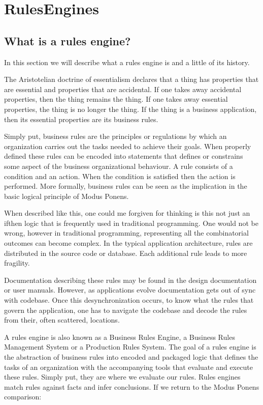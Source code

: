 \section{RulesEngines}

\subsection{What is a rules engine?}

In this section we will describe what a rules engine is and a little of its history.

The Aristotelian doctrine of essentialism declares that a thing has properties that are essential and properties that are accidental.
If one takes away accidental properties, then the thing remains the thing.
If one takes away essential properties, the thing is no longer the thing.
If the thing is a business application, then its essential properties are its business rules.


Simply put, business rules are the principles or regulations by which an organization carries out the tasks needed to achieve their goals.
When properly defined these rules can be encoded into statements that defines or constrains some aspect of the business organizational behaviour.
A rule consists of a condition and an action. 
When the condition is satisfied then the action is performed.
More formally, business rules can be seen as the implication in the basic logical principle of Modus Ponens.

When described like this, one could me forgiven for thinking is this not just an if\-then logic that is frequently used in traditional programming.
One would not be wrong, however in traditional programming, representing all the combinatorial outcomes can become complex.
In the typical application architecture, rules are distributed in the source code or database.
Each additional rule leads to more fragility.

Documentation describing these rules may be found in the design documentation or user manuals.
However, as applications evolve documentation gets out of sync with codebase.
Once this desynchronization occurs, to know what the rules that govern the application, one has to navigate the codebase and decode the rules from their, often scattered, locations.

A rules engine is also known as a Business Rules Engine, a Business Rules Management System or a Production Rules System.
The goal of a rules engine  is the abstraction of business rules into encoded and packaged logic that defines the tasks of an organization with the accompanying tools that evaluate and execute these rules.
Simply put, they are where we evaluate our rules.
Rules engines match rules against facts and infer conclusions. 
If we return to the Modus Ponens comparison:

